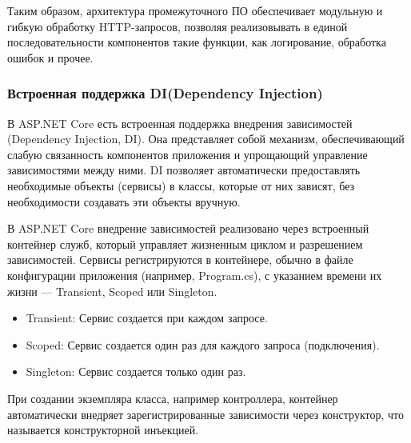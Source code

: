 Таким образом, архитектура промежуточного ПО обеспечивает модульную и гибкую обработку HTTP-запросов, позволяя реализовывать в единой последовательности компонентов такие функции, как логирование, обработка ошибок и прочее.

\subsubsection{Встроенная поддержка DI(Dependency Injection)}
В ASP.NET Core есть встроенная поддержка внедрения зависимостей (Dependency Injection, DI). Она представляет собой механизм, обеспечивающий слабую связанность компонентов приложения и упрощающий управление зависимостями между ними. DI позволяет автоматически предоставлять необходимые объекты (сервисы) в классы, которые от них зависят, без необходимости создавать эти объекты вручную.

В ASP.NET Core внедрение зависимостей реализовано через встроенный контейнер служб, который управляет жизненным циклом и разрешением зависимостей. Сервисы регистрируются в контейнере, обычно в файле конфигурации приложения (например, Program.cs), с указанием времени их жизни --- Transient,  Scoped или Singleton. 

\begin{itemize}
	\item{Transient: Сервис создается при каждом запросе.}
	\item{Scoped: Сервис создается один раз для каждого запроса (подключения).}
	\item{Singleton: Сервис создается только один раз.}
\end{itemize}

При создании экземпляра класса, например контроллера, контейнер автоматически внедряет зарегистрированные зависимости через конструктор, что называется конструкторной инъекцией.
